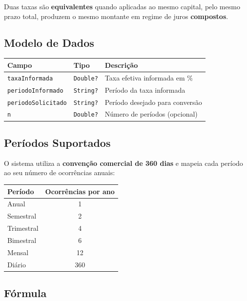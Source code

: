 \documentclass[12pt,a4paper]{article}
\begin{document}
Duas taxas são \textbf{equivalentes} quando aplicadas ao mesmo capital, pelo mesmo prazo total, produzem o mesmo montante em regime de juros \textbf{compostos}.

\subsection{Modelo de Dados}

\begin{center}
\begin{tabular}{llp{6.5cm}}
  \toprule
  \textbf{Campo} & \textbf{Tipo} & \textbf{Descrição} \\
  \midrule
  \texttt{taxaInformada}     & \texttt{Double?} & Taxa efetiva informada em \% \\
  \texttt{periodoInformado}  & \texttt{String?} & Período da taxa informada \\
  \texttt{periodoSolicitado} & \texttt{String?} & Período desejado para conversão \\
  \texttt{n}                 & \texttt{Double?} & Número de períodos (opcional) \\
  \bottomrule
\end{tabular}
\end{center}

\subsection{Períodos Suportados}

O sistema utiliza a \textbf{convenção comercial de 360 dias} e mapeia cada período ao seu número de ocorrências anuais:

\begin{center}
\begin{tabular}{lc}
  \toprule
  \textbf{Período} & \textbf{Ocorrências por ano} \\
  \midrule
  Anual      & 1 \\
  Semestral  & 2 \\
  Trimestral & 4 \\
  Bimestral  & 6 \\
  Mensal     & 12 \\
  Diário     & 360 \\
  \bottomrule
\end{tabular}
\end{center}

\subsection{Fórmula}
\end{document}
